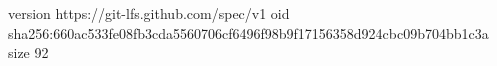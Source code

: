 version https://git-lfs.github.com/spec/v1
oid sha256:660ac533fe08fb3cda5560706cf6496f98b9f17156358d924cbc09b704bb1c3a
size 92
